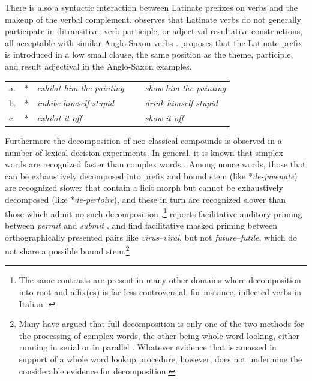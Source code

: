 There is also a syntactic interaction between Latinate prefixes on verbs and the makeup of the verbal complement. \citet{Harley2009} observes that Latinate verbs do not generally participate in ditransitive, verb participle, or adjectival resultative constructions, all acceptable with similar Anglo-Saxon verbs \citep[see also][]{Gropen1989,Coppock2008}. \citeauthor{Harley2009} proposes that the Latinate prefix is introduced in a low small clause, the same position as the theme, participle, and result adjectival in the Anglo-Saxon examples.

\begin{example} \label{harley}
\begin{tabular}{ll@{}ll@{}l}
a. & * & \emph{exhibit him the painting} & ~ & \emph{show him the painting} \\
b. & * & \emph{imbibe himself stupid}    & ~ & \emph{drink himself stupid}  \\
c. & * & \emph{exhibit it off}           & ~ & \emph{show it off}           \\
\end{tabular}
\end{example}

Furthermore the decomposition of neo-classical compounds is observed in a number of lexical decision experiments. In general, it is known that simplex words are recognized faster than complex words \citep{Caramazza1988}. Among nonce words, those that can be exhaustively decomposed into prefix and bound stem (like *\emph{de-juvenate}) are recognized slower that contain a licit morph but cannot be exhaustively decomposed (like *\emph{de-pertoire}), and these in turn are recognized slower than those which admit no such decomposition \citep{Taft1975}.\footnote{The same contrasts are present in many other domains where decomposition into root and affix(es) is far less controversial, for instance, inflected verbs in Italian \citep{Caramazza1988,Chialant1995}.} \citet{Emmorey1989} reports facilitative auditory priming between \emph{permit} and \emph{submit} \citep[though cf.][]{Marslen-Wilson1994}, and \citet{Taft2004a} find facilitative masked priming between orthographically presented pairs like \emph{virus}--\emph{viral}, but not \emph{future}--\emph{futile}, which do not share a possible bound stem.\footnote{Many have argued that full decomposition is only one of the two methods for the processing of complex words, the other being whole word looking, either running in serial \citep{Caramazza1988} or in parallel \citep{Baayen1997b}. Whatever evidence that is amassed in support of a whole word lookup procedure, however, does not undermine the considerable evidence for decomposition.}

